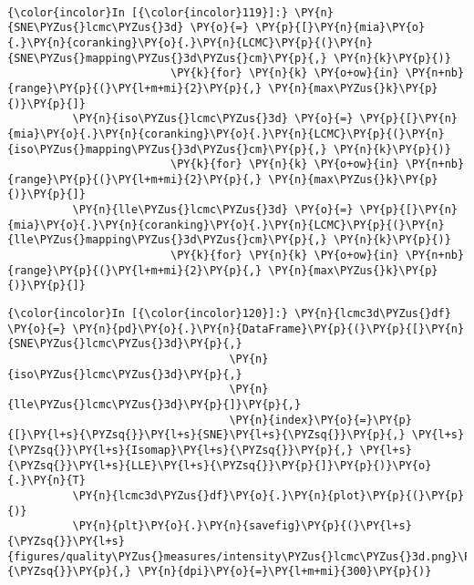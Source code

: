     \begin{center}
    \end{center}
    { \hspace*{\fill} \\}

    \begin{Verbatim}[commandchars=\\\{\}]
{\color{incolor}In [{\color{incolor}119}]:} \PY{n}{SNE\PYZus{}lcmc\PYZus{}3d} \PY{o}{=} \PY{p}{[}\PY{n}{mia}\PY{o}{.}\PY{n}{coranking}\PY{o}{.}\PY{n}{LCMC}\PY{p}{(}\PY{n}{SNE\PYZus{}mapping\PYZus{}3d\PYZus{}cm}\PY{p}{,} \PY{n}{k}\PY{p}{)}
                         \PY{k}{for} \PY{n}{k} \PY{o+ow}{in} \PY{n+nb}{range}\PY{p}{(}\PY{l+m+mi}{2}\PY{p}{,} \PY{n}{max\PYZus{}k}\PY{p}{)}\PY{p}{]}
          \PY{n}{iso\PYZus{}lcmc\PYZus{}3d} \PY{o}{=} \PY{p}{[}\PY{n}{mia}\PY{o}{.}\PY{n}{coranking}\PY{o}{.}\PY{n}{LCMC}\PY{p}{(}\PY{n}{iso\PYZus{}mapping\PYZus{}3d\PYZus{}cm}\PY{p}{,} \PY{n}{k}\PY{p}{)}
                         \PY{k}{for} \PY{n}{k} \PY{o+ow}{in} \PY{n+nb}{range}\PY{p}{(}\PY{l+m+mi}{2}\PY{p}{,} \PY{n}{max\PYZus{}k}\PY{p}{)}\PY{p}{]}
          \PY{n}{lle\PYZus{}lcmc\PYZus{}3d} \PY{o}{=} \PY{p}{[}\PY{n}{mia}\PY{o}{.}\PY{n}{coranking}\PY{o}{.}\PY{n}{LCMC}\PY{p}{(}\PY{n}{lle\PYZus{}mapping\PYZus{}3d\PYZus{}cm}\PY{p}{,} \PY{n}{k}\PY{p}{)}
                         \PY{k}{for} \PY{n}{k} \PY{o+ow}{in} \PY{n+nb}{range}\PY{p}{(}\PY{l+m+mi}{2}\PY{p}{,} \PY{n}{max\PYZus{}k}\PY{p}{)}\PY{p}{]}
\end{Verbatim}

    \begin{Verbatim}[commandchars=\\\{\}]
{\color{incolor}In [{\color{incolor}120}]:} \PY{n}{lcmc3d\PYZus{}df} \PY{o}{=} \PY{n}{pd}\PY{o}{.}\PY{n}{DataFrame}\PY{p}{(}\PY{p}{[}\PY{n}{SNE\PYZus{}lcmc\PYZus{}3d}\PY{p}{,}
                                  \PY{n}{iso\PYZus{}lcmc\PYZus{}3d}\PY{p}{,}
                                  \PY{n}{lle\PYZus{}lcmc\PYZus{}3d}\PY{p}{]}\PY{p}{,}
                                  \PY{n}{index}\PY{o}{=}\PY{p}{[}\PY{l+s}{\PYZsq{}}\PY{l+s}{SNE}\PY{l+s}{\PYZsq{}}\PY{p}{,} \PY{l+s}{\PYZsq{}}\PY{l+s}{Isomap}\PY{l+s}{\PYZsq{}}\PY{p}{,} \PY{l+s}{\PYZsq{}}\PY{l+s}{LLE}\PY{l+s}{\PYZsq{}}\PY{p}{]}\PY{p}{)}\PY{o}{.}\PY{n}{T}
          \PY{n}{lcmc3d\PYZus{}df}\PY{o}{.}\PY{n}{plot}\PY{p}{(}\PY{p}{)}
          \PY{n}{plt}\PY{o}{.}\PY{n}{savefig}\PY{p}{(}\PY{l+s}{\PYZsq{}}\PY{l+s}{figures/quality\PYZus{}measures/intensity\PYZus{}lcmc\PYZus{}3d.png}\PY{l+s}{\PYZsq{}}\PY{p}{,} \PY{n}{dpi}\PY{o}{=}\PY{l+m+mi}{300}\PY{p}{)}
\end{Verbatim}

